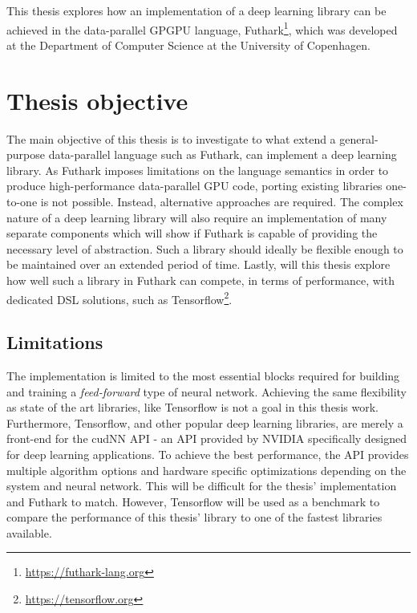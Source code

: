 This thesis explores how an implementation of a deep learning library can be
achieved in the data-parallel GPGPU language,
Futhark\footnote{\url{https://futhark-lang.org}}, which was developed at the
Department of Computer Science at the University of Copenhagen. 




\section{Thesis objective}
The main objective of this thesis is to investigate to what extend a
general-purpose data-parallel language such as Futhark, can implement a deep
learning library. 
As Futhark imposes limitations on the language semantics in order to produce
high-performance data-parallel GPU code, porting existing libraries one-to-one
is not possible. Instead, alternative approaches are required. 
The complex nature of a deep learning library will also require  an
implementation of many separate components which will show if Futhark is capable
of providing the necessary level of abstraction.  Such a library should ideally
be flexible enough to be maintained over an extended period of time. 
Lastly, will this thesis explore how well such a library in Futhark can compete,
in terms of performance, with dedicated DSL solutions, such as
Tensorflow\footnote{\url{https://tensorflow.org}}. \newline 

\subsection{Limitations}
The implementation is limited to the most essential blocks required for building
and training a \emph{feed-forward} type of neural network. 
Achieving the same flexibility as state of the art libraries, like Tensorflow is
not a goal in this thesis work. 
Furthermore, Tensorflow, and other popular deep learning libraries, are merely a
front-end for the cudNN API\cite{nvidia} - an API provided by NVIDIA
specifically designed for deep learning applications. 
To achieve the best performance, the API provides multiple algorithm options and
hardware specific optimizations depending on the system and neural network. 
This will be difficult for the thesis' implementation and Futhark to match. 
However, Tensorflow will be used as a benchmark to compare the performance of
this thesis' library to one of the fastest libraries available.

